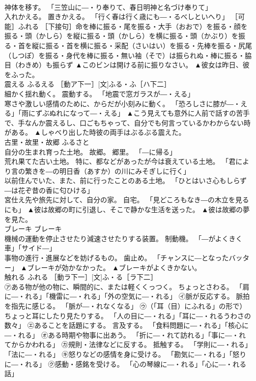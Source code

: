 \documentclass[8pt]{extreport}
\begin{document}
\begin{CJK}{UTF8}{min}
\\	神体を移す。 「三笠山に―・り奉りて、春日明神と名づけ奉りて」 
\\	入れかえる。 置きかえる。 「行く春は行く歳にも―・るべしといへり」 ［可能］ふれる ［下接句］命を棒に振る・尾を振る・大手（おおで）を振る・顔を振る・頭（かしら）を縦に振る・頭（かしら）を横に振る・頭（かぶり）を振る・首を縦に振る・首を横に振る・采配（さいはい）を振る・先棒を振る・尻尾（しつぽ）を振る・身代を棒に振る・無い袖（そで）は振られぬ・棒に振る・脇目（わきめ）も振らず	▲このビンは開ける前に振りなさい。 ▲彼女は昨日、彼をふった。
\\	震える	ふるえる	［動ア下一］[文]ふる・ふ［ハ下二］ 
\\	細かく揺れ動く。 震動する。 「地震で窓ガラスが―・える」 
\\	寒さや激しい感情のために、からだが小刻みに動く。 「恐ろしさに膝が―・える」「雨にずぶぬれになって―・える」	▲こう見えても意外に人前で話すの苦手で、手なんか震えるし、口ごもちゃって、自分でも何言っているかわからない時がある。 ▲しゃべり出した時彼の両手はぶるぶる震えた。
\\	古里・故里・故郷	ふるさと	
\\	自分の生まれ育った土地。 故郷。 郷里。 「―に帰る」 
\\	荒れ果てた古い土地。 特に、都などがあったが今は衰えている土地。 「君により言の繁きを―の明日香（あすか）の川にみそぎしに行く」 
\\	以前住んでいた、また、前に行ったことのある土地。 「ひとはいさ心もしらず―は花ぞ昔の香に匂ひける」 
\\	宮仕え先や旅先に対して、自分の家。 自宅。 「見どころもなき―の木立を見るにも」	▲彼は故郷の町に引退し、そこで静かな生活を送った。 ▲彼は故郷の夢を見た。
\\	ブレーキ	ブレーキ	
\\	機械の運動を停止させたり減速させたりする装置。 制動機。 「―がよくきく車」「サイド―」 
\\	事物の進行・進展などを妨げるもの。 歯止め。 「チャンスに―となったバッター」	▲ブレーキが効かなかった。 ▲ブレーキがよくきかない。
\\	触れる	ふれる	［動ラ下一］[文]ふ・る［ラ下二］ 
\\	㋐ある物が他の物に、瞬間的に、または軽くくっつく。 ちょっとさわる。 「肩に―・れる」「機雷に―・れる」「外の空気に―・れる」 ㋑脈が反応する。 脈拍を指先に感じる。 「脈が―・れなくなる」 ㋒（「耳（目）にふれる」の形で）ちょっと耳にしたり見たりする。 「人の目に―・れる」「耳に―・れるうわさの数々」 ㋓あることを話題にする。 言及する。 「食料問題に―・れる」「核心に―・れる」 ㋔ある時期や物事に出あう。 「折に―・れて訪れる」「事に―・れてからかわれる」 ㋕規則・法律などに反する。 抵触する。 「学則に―・れる」「法に―・れる」 ㋖怒りなどの感情を身に受ける。 「勘気に―・れる」「怒りに―・れる」 ㋗感動・感銘を受ける。 「心の琴線に―・れる」「心に―・れる話」 

\end{CJK}
\end{document}
